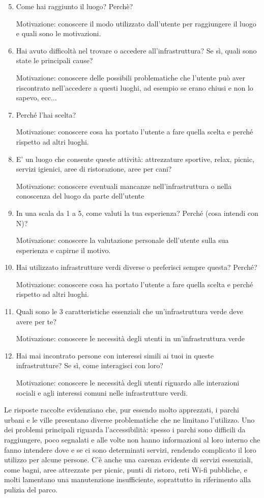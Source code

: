 \begin{enumerate}\setcounter{enumi}{4}
    \item Come hai raggiunto il luogo? Perchè?

    Motivazione: conoscere il modo utilizzato dall'utente per raggiungere il luogo e quali sono le motivazioni.
    \item Hai avuto difficoltà nel trovare o accedere all'infrastruttura? Se sì, quali sono state le principali cause?
    
    Motivazione: conoscere delle possibili problematiche che l'utente può aver riscontrato nell'accedere a questi luoghi, ad esempio se erano chiusi e non lo sapevo, ecc...
    \item Perché l'hai scelta?

    Motivazione: conoscere cosa ha portato l'utente a fare quella scelta e perché rispetto ad altri luoghi.
    \item E' un luogo che consente queste attività: attrezzature sportive, relax, picnic, servizi igienici, aree di ristorazione, aree per cani?

    Motivazione: conoscere eventuali mancanze nell'infrastruttura o nella conoscenza del luogo da parte dell'utente
    \item In una scala da 1 a 5, come valuti la tua esperienza? Perché (cosa intendi con N)?

    Motivazione: conoscere la valutazione personale dell'utente sulla sua esperienza e capirne il motivo.
    \item Hai utilizzato infrastrutture verdi diverse o preferisci sempre questa? Perché?
    
    Motivazione: conoscere cosa ha portato l'utente a fare quella scelta e perché rispetto ad altri luoghi.
    \item Quali sono le 3 caratteristiche essenziali che un'infrastruttura verde deve avere per te?
    
    Motivazione: conoscere le necessità degli utenti in un'infrastruttura verde
    \item Hai mai incontrato persone con interessi simili ai tuoi in queste infrastrutture? Se sì, come interagisci con loro?
    
    Motivazione: conoscere le necessità degli utenti riguardo alle interazioni sociali e agli interessi comuni nelle infrastrutture verdi.
\end{enumerate}
Le risposte raccolte evidenziano che, pur essendo molto apprezzati, i parchi urbani e le ville presentano diverse problematiche che ne limitano l'utilizzo. Uno dei problemi principali riguarda l'accessibilità: spesso i parchi sono difficili da raggiungere, poco segnalati e alle volte non hanno informazioni al loro interno che fanno intendere dove e se ci sono determinati servizi, rendendo complicato il loro utilizzo per alcune persone. C'è anche una carenza evidente di servizi essenziali, come bagni, aree attrezzate per picnic, punti di ristoro, reti Wi-fi pubbliche, e molti lamentano una manutenzione insufficiente, soprattutto in riferimento alla pulizia del parco.
